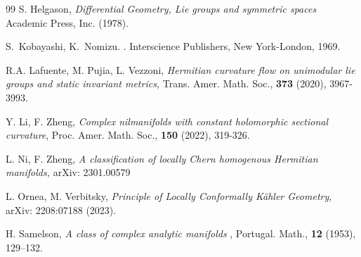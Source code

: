 \documentclass{amsart}
\numberwithin{equation}{section}
\theoremstyle{definition}
\renewcommand{\1}{\mathds{1}}
\renewcommand{\>}{\rightarrow}
\begin{document}
\begin{thebibliography}{99}
 S. Helgason,
\newblock\textit{Differential Geometry, Lie groups and symmetric spaces}
\newblock Academic Press, Inc. (1978).



 S.~Kobayashi, K.~Nomizu.
.
\newblock Interscience Publishers, New York-London, 1969.



 R.A. Lafuente, M. Pujia, L. Vezzoni,
\newblock\textit{Hermitian curvature flow on unimodular lie groups and static invariant metrics,}
\newblock Trans. Amer. Math. Soc., \textbf{373} (2020), 3967-3993.

 Y. Li, F. Zheng,
\newblock \textit{Complex nilmanifolds with constant holomorphic sectional curvature},
\newblock Proc. Amer. Math. Soc., \textbf{150} (2022), 319-326.


 L. Ni, F. Zheng,
\newblock \textit{       A classification of locally Chern homogenous Hermitian manifolds, }
\newblock arXiv: 2301.00579

 L. Ornea, M. Verbitsky,
\newblock \textit{Principle of Locally Conformally K\"ahler Geometry},
\newblock arXiv: 2208:07188  (2023).



 H. Samelson,
\newblock \textit{A class of complex analytic manifolds },
\newblock Portugal. Math., \textbf{12} (1953), 129–132.



\end{thebibliography}
\end{document}
